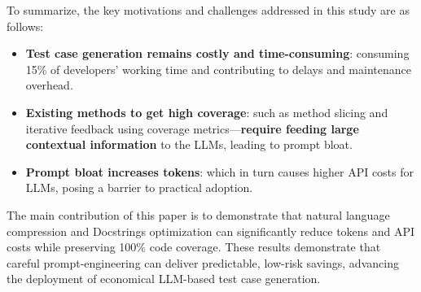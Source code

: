 To summarize, the key motivations and challenges addressed in this study are as follows:

\begin{itemize}[label={$\bullet$}]
    \item \textbf{Test case generation remains costly and time-consuming}: consuming 15\% of developers’ working time and contributing to delays and maintenance overhead.
    \vspace{0.2cm}
    
    \item \textbf{Existing methods to get high coverage}: such as method slicing and iterative feedback using coverage metrics—\textbf{require feeding large contextual information} to the LLMs, leading to prompt bloat.
    \vspace{0.2cm}
    
    \item \textbf{Prompt bloat increases tokens}: which in turn causes higher API costs for LLMs, posing a barrier to practical adoption.
\end{itemize}

The main contribution of this paper is to demonstrate that natural language compression and Docstrings optimization can significantly reduce tokens and API costs while preserving 100\% code coverage. These results demonstrate that careful prompt-engineering can deliver predictable, low-risk savings, advancing the deployment of economical LLM-based test case generation.
